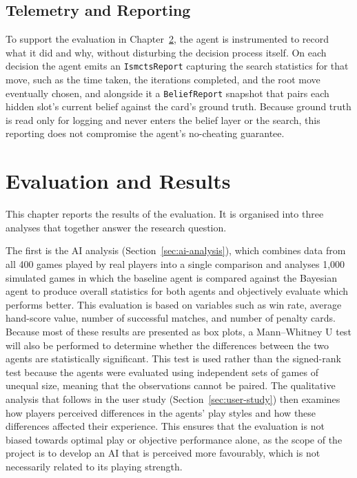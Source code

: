 \documentclass[12pt,a4paper,oneside]{report}
\begin{document}
\section{Telemetry and Reporting}
\label{sec:telemetry}

To support the evaluation in Chapter~\ref{chap:results}, the agent is instrumented to
record what it did and why, without disturbing the decision process itself. On each
decision the agent emits an \texttt{IsmctsReport} capturing the search statistics for
that move, such as the time taken, the iterations completed, and the root move
eventually chosen, and alongside it a \texttt{BeliefReport} snapshot that pairs each
hidden slot's current belief against the card's ground truth. Because ground truth is
read only for logging and never enters the belief layer or the search, this reporting
does not compromise the agent's no-cheating guarantee.


\chapter{Evaluation and Results}\label{chap:results}
\label{ch:results}

This chapter reports the results of the evaluation. It is organised into three analyses that together answer the research question.

The first is the AI analysis (Section~\ref{sec:ai-analysis}), which combines data from all 400 games played by real players into a single comparison and analyses 1,000 simulated games in which the baseline agent is compared against the Bayesian agent to produce overall statistics for both agents and objectively evaluate which performs better. This evaluation is based on variables such as win rate, average hand-score value, number of successful matches, and number of penalty cards. Because most of these results are presented as box plots, a Mann–Whitney U test will also be performed to determine whether the differences between the two agents are statistically significant. This test is used rather than the signed-rank test because the agents were evaluated using independent sets of games of unequal size, meaning that the observations cannot be paired. The qualitative analysis that follows in the user study (Section~\ref{sec:user-study}) then examines how players perceived differences in the agents’ play styles and how these differences affected their experience. This ensures that the evaluation is not biased towards optimal play or objective performance alone, as the scope of the project is to develop an AI that is perceived more favourably, which is not necessarily related to its playing strength.
\end{document}
